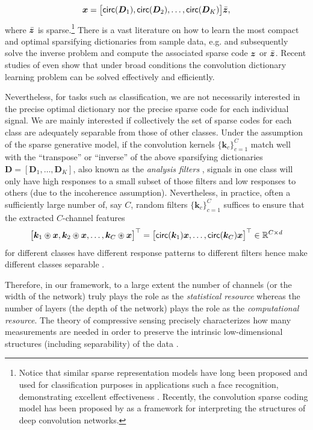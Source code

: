 \documentclass[../../book-main.tex]{subfiles}
\begin{document}
\begin{equation}
\bm{x} = \big[\mathsf{circ}(\bm{D}_1), \mathsf{circ}(\bm{D}_2), \ldots, \mathsf{circ}(\bm{D}_K)\big] \bar {\bm{z}},
\end{equation}
where $\bar {\bm{z}}$ is sparse.\footnote{Notice that similar sparse representation models have long been proposed and used for classification purposes in applications such a face recognition, demonstrating excellent effectiveness  \cite{Wright:2009,wagner2012toward}. Recently, the convolution sparse coding model has been proposed by \cite{papyan2017convolutional} as a framework for interpreting the structures of deep convolution networks.} There is a vast literature on how to learn the most compact and optimal sparsifying dictionaries from sample data, e.g.  \cite{li2019multichannel,qu2019nonconvex} and subsequently solve the inverse problem and compute the associated sparse code $\bm{z}$ or $\bar {\bm{z}}$. Recent studies of \cite{qu2020nonconvex,Qu2020Geometric} even show that under broad conditions the convolution dictionary learning problem can be solved effectively and efficiently. 

Nevertheless, for tasks such as classification, we are not necessarily interested in the precise optimal dictionary nor the precise sparse code for each individual signal. We are mainly interested if collectively the set of sparse codes for each class are adequately separable from those of other classes. Under the assumption of the sparse generative model, if the convolution kernels $\{\bm k_c\}_{c=1}^C$  match well with the ``transpose'' or ``inverse'' of the above sparsifying dictionaries $\bm D = [\bm D_1, \ldots, \bm D_K]$, also known as the {\em analysis filters} \cite{Cosparse-Nam,Analysis-Filter}, signals in one class will only have high responses to a small subset of those filters and low responses to others (due to the incoherence assumption).  Nevertheless, in practice, often a sufficiently large number of, say $C$, random filters $\{\bm k_c\}_{c=1}^C$ suffices to ensure that the extracted $C$-channel features
\begin{equation}
\big[\bm k_1 \circledast \bm{x}, \bm k_2 \circledast \bm{x}, \ldots, \bm k_C \circledast \bm{x}\big]^\top = \big[\mathsf{circ}(\bm k_1) \bm{x}, \ldots, \mathsf{circ}(\bm k_C) \bm{x} \big]^\top \in \mathbb{R}^{C\times d}
\end{equation}
for different classes have different response patterns to different filters hence make different classes separable \cite{chan2015pcanet}. 

Therefore, in our framework, to a large extent the number of channels (or the width of the network) truly plays the role as the  {\em statistical resource} whereas the number of layers (the depth of the network) plays the role as the {\em computational resource}. The theory of compressive sensing precisely characterizes how many measurements are needed in order to preserve the intrinsic low-dimensional structures (including separability) of the data \cite{Wright-Ma-2021}. %
\end{document}
